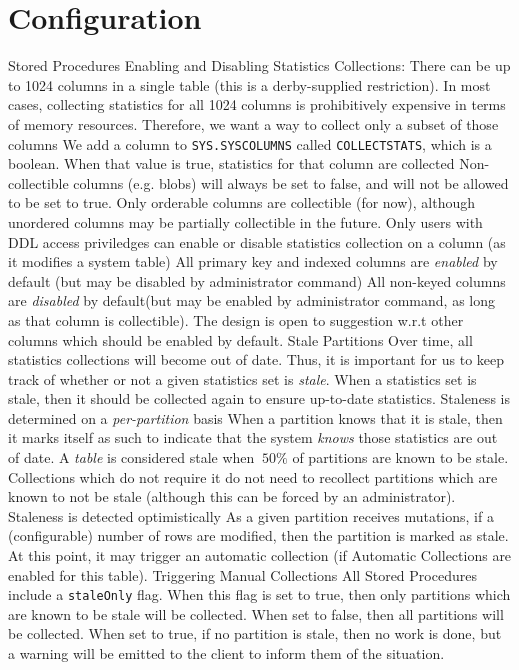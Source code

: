\documentclass[10pt]{amsart}
\begin{document}
\section{Configuration}
\begin{outline}[enumerate]
\1 Stored Procedures
	\2 Enabling and Disabling Statistics Collections:
		\3[*] There can be up to 1024 columns in a single table (this is a derby-supplied restriction). In most cases, collecting statistics for all 1024 columns is prohibitively expensive in terms of memory resources. Therefore, we want a way to collect only a subset of those columns
		\3 We add a column to \texttt{SYS.SYSCOLUMNS} called \texttt{COLLECTSTATS}, which is a boolean. When that value is true, statistics for that column are collected
			\4 Non-collectible columns (e.g. blobs) will always be set to false, and will not be allowed to be set to true. Only orderable columns are collectible (for now), although unordered columns may be partially collectible in the future.
			\4 Only users with DDL access priviledges can enable or disable statistics collection on a column (as it modifies a system table)
			\4 All primary key and indexed columns are \emph{enabled} by default (but may be disabled by administrator command)
			\4 All non-keyed columns are \emph{disabled} by default(but may be enabled by administrator command, as long as that column is collectible).
			\4 The design is open to suggestion w.r.t other columns which should be enabled by default.
	\2 Stale Partitions
		\3[*] Over time, all statistics collections will become out of date. Thus, it is important for us to keep track of whether or not a given statistics set is \emph{stale}. When a statistics set is stale, then it should be collected again to ensure up-to-date statistics.
		\3 Staleness is determined on a \emph{per-partition} basis
			\4 When a partition knows that it is stale, then it marks itself as such to indicate that the system \emph{knows} those statistics are out of date. 
			\4 A \emph{table} is considered stale when $\>50\%$ of partitions are known to be stale. 
			\4 Collections which do not require it do not need to recollect partitions which are known to not be stale (although this can be forced by an administrator).
		\3 Staleness is detected optimistically
			\4[*] As a given partition receives mutations, if a (configurable) number of rows are modified, then the partition is marked as stale. At this point, it may trigger an automatic collection (if Automatic Collections are enabled for this table).
	\2 Triggering Manual Collections
		\3 All Stored Procedures include a \texttt{staleOnly} flag. When this flag is set to true, then only partitions which are known to be stale will be collected. When set to false, then all partitions will be collected. When set to true, if no partition is stale, then no work is done, but a warning will be emitted to the client to inform them of the situation.

\end{outline}
\end{document}
